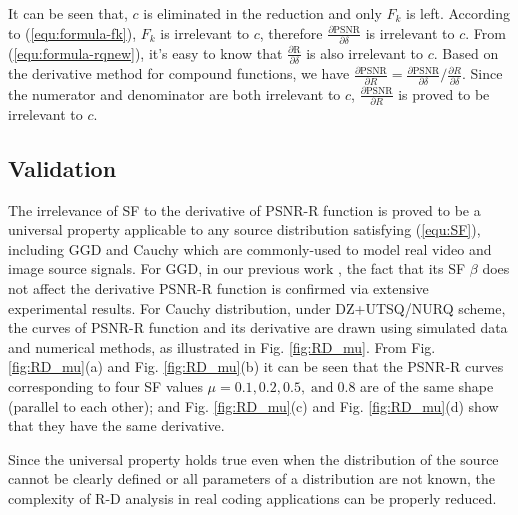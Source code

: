 \documentclass[smallabstract,smallcaptions]{dccpaper}
\begin{document}
It can be seen that, $c$ is eliminated in the reduction and only $F_k$ is left. According to (\ref{equ:formula-fk}), $F_k$ is irrelevant to $c$, therefore $\frac{\partial\textrm{PSNR}}{\partial\delta}$ is irrelevant to $c$. From (\ref{equ:formula-rqnew}), it's easy to know that $\frac{\partial\textrm{R}}{\partial\delta}$ is also irrelevant to $c$. Based on the derivative method for compound functions, we have $\frac{\partial\textrm{PSNR}}{\partial R} = \frac{\partial\textrm{PSNR}}{\partial\delta}/\frac{\partial R}{\partial\delta}$. Since the numerator and denominator are both irrelevant to $c$, $\frac{\partial\textrm{PSNR}}{\partial R}$ is proved to be irrelevant to $c$.

\subsection{Validation}

The irrelevance of SF to the derivative of PSNR-R function is proved to be a universal property applicable to any source distribution satisfying (\ref{equ:SF}), including GGD and Cauchy which are commonly-used to model real video and image source signals. For GGD, in our previous work \cite{Sun_TCSVT2009}, the fact that its SF $\beta$ does not affect the derivative PSNR-R function is confirmed via extensive experimental results. For Cauchy distribution, under DZ+UTSQ/NURQ scheme, the curves of PSNR-R function and its derivative are drawn using simulated data and numerical methods, as illustrated in Fig. \ref{fig:RD_mu}. From Fig. \ref{fig:RD_mu}(a) and Fig. \ref{fig:RD_mu}(b) it can be seen that the PSNR-R curves corresponding to four SF values $\mu = 0.1, 0.2, 0.5, \; \textrm{and} \;0.8$ are of the same shape (parallel to each other); and Fig. \ref{fig:RD_mu}(c) and Fig. \ref{fig:RD_mu}(d) show that they have the same derivative.

Since the universal property holds true even when the distribution of the source cannot be clearly defined or all parameters of a distribution are not known, the complexity of R-D analysis in real coding applications can be properly reduced.
\end{document}
